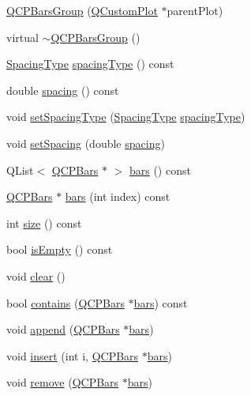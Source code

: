 \begin{DoxyCompactItemize}
\item 
\hyperlink{class_q_c_p_bars_group_aa4e043b9a22c6c5ea0f93740aca063e1}{Q\+C\+P\+Bars\+Group} (\hyperlink{class_q_custom_plot}{Q\+Custom\+Plot} $\ast$parent\+Plot)
\item 
virtual \hyperlink{class_q_c_p_bars_group_adb9475bcb6a5f18c8918e17d939d8dbd}{$\sim$\+Q\+C\+P\+Bars\+Group} ()
\item 
\hyperlink{class_q_c_p_bars_group_a4c0521120a97e60bbca37677a37075b6}{Spacing\+Type} \hyperlink{class_q_c_p_bars_group_a1bb562f669d47bd7d3cdd2da1f7d8f00}{spacing\+Type} () const 
\item 
double \hyperlink{class_q_c_p_bars_group_a730bffefcac6c97aaf60e6f64dd3bcd9}{spacing} () const 
\item 
void \hyperlink{class_q_c_p_bars_group_a2c7e2d61b10594a4555b615e1fcaf49e}{set\+Spacing\+Type} (\hyperlink{class_q_c_p_bars_group_a4c0521120a97e60bbca37677a37075b6}{Spacing\+Type} \hyperlink{class_q_c_p_bars_group_a1bb562f669d47bd7d3cdd2da1f7d8f00}{spacing\+Type})
\item 
void \hyperlink{class_q_c_p_bars_group_aa553d327479d72a0c3dafcc724a190e2}{set\+Spacing} (double \hyperlink{class_q_c_p_bars_group_a730bffefcac6c97aaf60e6f64dd3bcd9}{spacing})
\item 
Q\+List$<$ \hyperlink{class_q_c_p_bars}{Q\+C\+P\+Bars} $\ast$ $>$ \hyperlink{class_q_c_p_bars_group_a7c72ed1f8cd962c93b8c42ab96cd91ec}{bars} () const 
\item 
\hyperlink{class_q_c_p_bars}{Q\+C\+P\+Bars} $\ast$ \hyperlink{class_q_c_p_bars_group_a72d022790b7c93151c95c28eefaf51b4}{bars} (int index) const 
\item 
int \hyperlink{class_q_c_p_bars_group_af07364189c5717a158ec95b609687532}{size} () const 
\item 
bool \hyperlink{class_q_c_p_bars_group_a1d89da4e9176f4f77105e9a4afd44e2b}{is\+Empty} () const 
\item 
void \hyperlink{class_q_c_p_bars_group_a3ddf23928c6cd89530bd34ab7ba7b177}{clear} ()
\item 
bool \hyperlink{class_q_c_p_bars_group_adb4837894167e629e42e200db056fac3}{contains} (\hyperlink{class_q_c_p_bars}{Q\+C\+P\+Bars} $\ast$\hyperlink{class_q_c_p_bars_group_a7c72ed1f8cd962c93b8c42ab96cd91ec}{bars}) const 
\item 
void \hyperlink{class_q_c_p_bars_group_a809ed63cc4ff7cd5b0b8c96b470163d3}{append} (\hyperlink{class_q_c_p_bars}{Q\+C\+P\+Bars} $\ast$\hyperlink{class_q_c_p_bars_group_a7c72ed1f8cd962c93b8c42ab96cd91ec}{bars})
\item 
void \hyperlink{class_q_c_p_bars_group_a309a5f7233db189f3ea9c2d04ece6c13}{insert} (int i, \hyperlink{class_q_c_p_bars}{Q\+C\+P\+Bars} $\ast$\hyperlink{class_q_c_p_bars_group_a7c72ed1f8cd962c93b8c42ab96cd91ec}{bars})
\item 
void \hyperlink{class_q_c_p_bars_group_a215e28a5944f1159013a0e19169220e7}{remove} (\hyperlink{class_q_c_p_bars}{Q\+C\+P\+Bars} $\ast$\hyperlink{class_q_c_p_bars_group_a7c72ed1f8cd962c93b8c42ab96cd91ec}{bars})
\end{DoxyCompactItemize}

